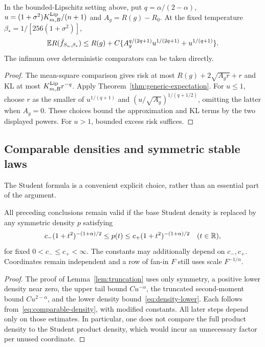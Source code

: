\begin{corollary}
In the bounded-Lipschitz setting above, put $q=\alpha/(2-\alpha)$,
$u=(1+\sigma^2)K^{\rm Lip}_{m,B}/(n+1)$ and $A_g=R(g)-R_0$.
At the fixed temperature $\beta_*=1/[256(1+\sigma^2)]$,
\[
 \mathbb E R(\bar f_{S_n,\beta_*})
 \le R(g)+C\{A_g^{q/(2q+1)}u^{1/(2q+1)}
                         +u^{1/(q+1)}\}.
\]
The infimum over deterministic comparators can be taken directly.
\end{corollary}
\begin{proof}
The mean-square comparison gives risk at most
$R(g)+2\sqrt{A_g r}+r$ and KL at most $K^{\rm Lip}_{m,B}r^{-q}$.
Apply Theorem~\ref{thm:generic-expectation}. For $u\le1$, choose $r$ as the smaller of $u^{1/(q+1)}$ and $(u/\sqrt{A_g})^{1/(q+1/2)}$, omitting the latter when $A_g=0$. These choices bound the approximation and KL terms by the two displayed powers. For $u>1$, bounded excess risk suffices.
\end{proof}

\subsection{Comparable densities and symmetric stable laws}
The Student formula is a convenient explicit choice, rather than an essential part of the argument.

\begin{corollary}\label{cor:comparable-density}
All preceding conclusions remain valid if the base Student density is replaced by any symmetric density $p$ satisfying
\begin{equation}
 c_-(1+t^2)^{-(1+\alpha)/2}
 \le p(t)\le c_+(1+t^2)^{-(1+\alpha)/2}
 \quad(t\in\mathbb R),
 \label{eq:comparable-density}
\end{equation}
for fixed $0<c_-\le c_+<\infty$. The constants may additionally depend on $c_-,c_+$. Coordinates remain independent and a row of fan-in $F$ still uses scale $F^{-1/\alpha}$.
\end{corollary}
\begin{proof}
The proof of Lemma~\ref{lem:truncation} uses only symmetry, a positive lower density near zero, the upper tail bound $C u^{-\alpha}$, the truncated second-moment bound $C u^{2-\alpha}$, and the lower density bound~\eqref{eq:density-lower}. Each follows from~\eqref{eq:comparable-density}, with modified constants. All later steps depend only on those estimates. In particular, one does not compare the full product density to the Student product density, which would incur an unnecessary factor per unused coordinate.
\end{proof}

